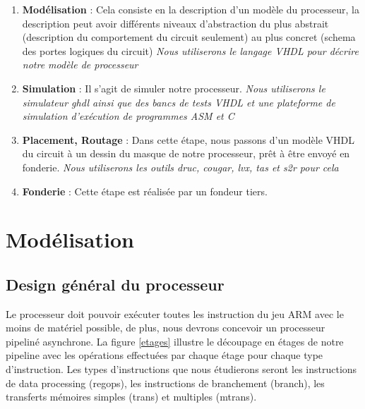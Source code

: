 \documentclass{article}
\begin{document}
\begin{enumerate}
\item \textbf{Modélisation}  : Cela consiste en la description d'un modèle du processeur,
                      la description peut avoir différents niveaux d'abstraction
                      du plus abstrait (description du comportement du circuit seulement)
                      au plus concret (schema des portes logiques du circuit)
                      \textit{Nous utiliserons le langage VHDL pour décrire notre modèle de processeur}
\item \textbf{Simulation}    : Il s'agit de simuler notre processeur.
                      \textit{Nous utiliserons le simulateur ghdl ainsi que des bancs de tests VHDL
                      et une plateforme de simulation d'exécution de programmes ASM et C}
\item \textbf{Placement, Routage} : Dans cette étape, nous passons d'un modèle VHDL du circuit à un
                          dessin du masque de notre processeur, prêt à être envoyé en fonderie.
                          \textit{Nous utiliserons les outils druc, cougar, lvx, tas et s2r pour cela}
\item \textbf{Fonderie} :          Cette étape est réalisée par un fondeur tiers.
\end{enumerate}

\section{Modélisation}

\subsection{Design général du processeur}

Le processeur doit pouvoir exécuter toutes les instruction du jeu ARM avec le moins
de matériel possible, de plus, nous devrons concevoir un processeur pipeliné asynchrone.
La figure \ref{etages} illustre le découpage en étages de notre pipeline avec les opérations effectuées
par chaque étage pour chaque type d'instruction.
Les types d'instructions que nous étudierons seront les instructions de data processing (regops),
les instructions de branchement (branch), les transferts mémoires simples (trans) et multiples (mtrans).
\end{document}
